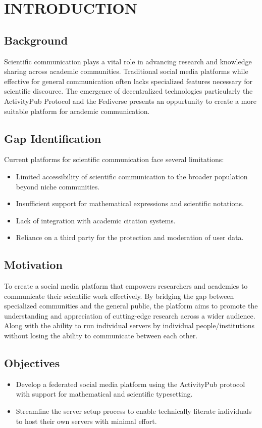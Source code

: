 \chapter{INTRODUCTION}
\section{Background}
Scientific communication plays a vital role in advancing research and knowledge sharing across academic communities. Traditional social media platforms while effective for general communication often lacks specialized features necessary for scientific discource. The emergence of decentralized technologies particularly the ActivityPub \cite{ActivityPub} Protocol and the Fediverse presents an oppurtunity to create a more suitable platform for academic communication. 
\section{Gap Identification}
Current platforms for scientific communication face several limitations:

\begin{itemize}
  \item Limited accessibility of scientific communication to the broader population beyond niche communities.
  \item Insufficient support for mathematical expressions and scientific notations.
  \item Lack of integration with academic citation systems.
  \item Reliance on a third party for the protection and moderation of user data.
\end{itemize}

\section{Motivation}
To create a social media platform that empowers researchers and academics to communicate their scientific work effectively. By bridging the gap between specialized communities and the general public, the platform aims to promote the understanding and appreciation of cutting-edge research across a wider audience. Along with the ability to run individual servers by individual people/institutions without losing the ability to communicate between each other.

\section{Objectives}
\begin{itemize}
  \item Develop a federated social media platform using the ActivityPub protocol with support for mathematical and scientific typesetting.
  \item Streamline the server setup process to enable technically literate individuals to host their own servers with minimal effort.
\end{itemize}
